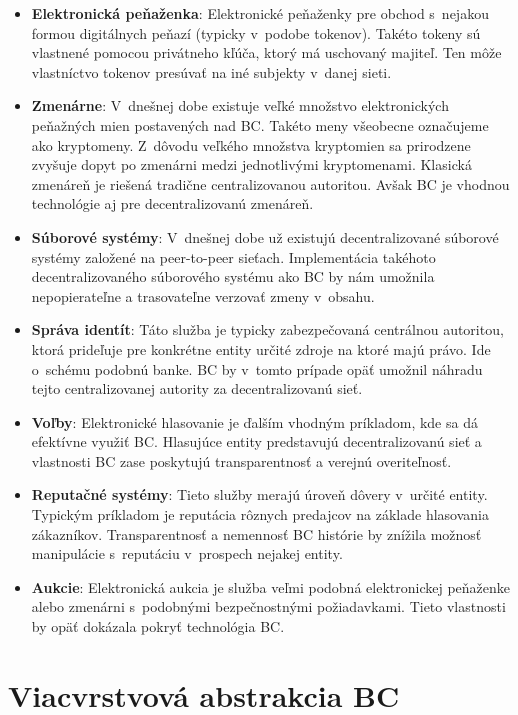 \begin{itemize}
	\item \textbf{Elektronická peňaženka}: Elektronické peňaženky pre obchod s~nejakou formou digitálnych peňazí (typicky v~podobe tokenov). Takéto tokeny sú vlastnené pomocou privátneho kľúča, ktorý má uschovaný majiteľ. Ten môže vlastníctvo tokenov presúvať na iné subjekty v~danej sieti.
	\item \textbf{Zmenárne}: V~dnešnej dobe existuje veľké množstvo elektronických peňažných mien postavených nad BC. Takéto meny všeobecne označujeme ako kryptomeny. Z~dôvodu veľkého množstva kryptomien sa prirodzene zvyšuje dopyt po zmenárni medzi jednotlivými kryptomenami. Klasická zmenáreň je riešená tradične centralizovanou autoritou. Avšak BC je vhodnou technológie aj pre decentralizovanú zmenáreň.
	\item \textbf{Súborové systémy}: V~dnešnej dobe už existujú decentralizované súborové systémy založené na peer-to-peer sieťach. Implementácia takéhoto decentralizovaného súborového systému ako BC by nám umožnila nepopierateľne a trasovateľne verzovať zmeny v~obsahu.
	\item \textbf{Správa identít}: Táto služba je typicky zabezpečovaná centrálnou autoritou, ktorá prideľuje pre konkrétne entity určité zdroje na ktoré majú právo. Ide o~schému podobnú banke. BC by v~tomto prípade opäť umožnil náhradu tejto centralizovanej autority za decentralizovanú sieť.
	\item \textbf{Voľby}: Elektronické hlasovanie je ďalším vhodným príkladom, kde sa dá efektívne využiť BC. Hlasujúce entity predstavujú decentralizovanú sieť a vlastnosti BC zase poskytujú transparentnosť a verejnú overiteľnosť.
	\item \textbf{Reputačné systémy}: Tieto služby merajú úroveň dôvery v~určité entity. Typickým príkladom je reputácia rôznych predajcov na základe hlasovania zákazníkov. Transparentnosť a nemennosť BC histórie by znížila možnosť manipulácie s~reputáciu v~prospech nejakej entity.
	\item \textbf{Aukcie}: Elektronická aukcia je služba veľmi podobná elektronickej peňaženke alebo zmenárni s~podobnými bezpečnostnými požiadavkami. Tieto vlastnosti by opäť dokázala pokryť technológia BC.
\end{itemize}

\section{Viacvrstvová abstrakcia BC}

